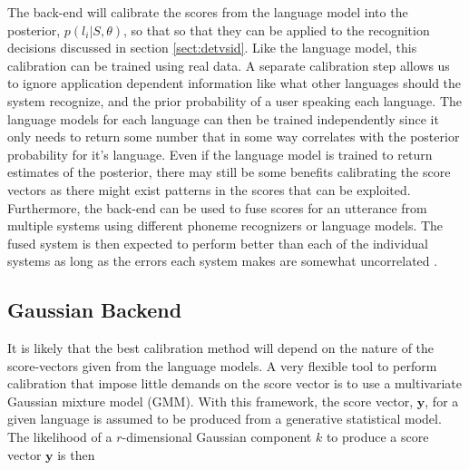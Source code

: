 The back-end will calibrate the scores from the language model into the posterior, $p(l_i | S, \theta)$, so that so that they can be applied to the recognition decisions discussed in section \ref{sect:detvsid}. Like the language model, this calibration can be trained using real data. A separate calibration step allows us to ignore application dependent information like what other languages should the system recognize, and the prior probability of a user speaking each language. The language models for each language can then be trained independently since it only needs to return some number that in some way correlates with the posterior probability for it's language. Even if the language model is trained to return estimates of the posterior, there may still be some benefits calibrating the score vectors as there might exist patterns in the scores that can be exploited. Furthermore, the back-end can be used to fuse scores for an utterance from multiple systems using different phoneme recognizers or language models. The fused system is then expected to perform better than each of the individual systems as long as the errors each system makes are somewhat uncorrelated \cite[818]{lidbok}.

\subsection{Gaussian Backend}

It is likely that the best calibration method will depend on the nature of the score-vectors given from the language models. A very flexible tool to perform calibration that impose little demands on the score vector is to use a multivariate Gaussian mixture model (GMM). With this framework, the score vector, $\mathbf{y}$, for a given language is assumed to be produced from a generative statistical model. The likelihood of a $r$-dimensional Gaussian component $k$ to produce a score vector $\mathbf{y}$ is then

